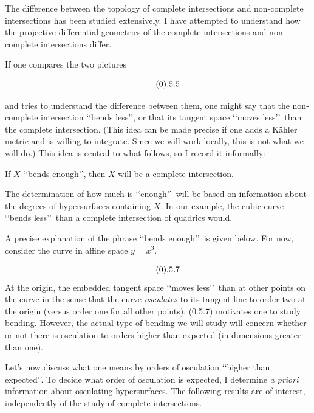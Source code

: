 \smallpagebreak

 
 The difference between the topology
  of complete intersections and non-complete intersections  
has been
studied extensively. I have attempted to understand how the projective
differential geometries of the complete intersections
and non-complete intersections differ.



If one compares the two pictures
$$
\ 
$$

\bigpagebreak

$$
\ \tag 0.5.5
$$

\noindent and tries to understand   the difference between
them, one might say that
the non-complete intersection \lq\lq bends less\rq\rq ,
or that its tangent space \lq\lq moves less\rq\rq\ 
than the complete intersection. (This idea can be made precise
 if one adds a K\"ahler metric and is willing to integrate.
Since we will work locally, this is not   what we will do.)
This idea  is central to what follows, so
I record it informally:

 If  
    $X$ \lq\lq bends
enough\rq\rq , then $X$ will be a complete intersection.
\endproclaim


 
The determination of how much is \lq\lq enough\rq\rq\
 will be based on
information about the degrees of hypersurfaces containing $X$. 
In our example, the cubic curve 
\lq\lq bends less\rq\rq\ than a complete intersection of quadrics
would.




A precise explanation of the phrase \lq\lq bends enough\rq\rq\
is given below.
For now, consider the curve in affine space $y= x^3$.
$$
\ 
$$

$$
\ \tag 0.5.7
$$
At the origin, the embedded tangent space \lq\lq moves less\rq\rq\
 than at
other points on the curve in the sense that the curve {\it osculates}
 to its tangent line
to order two at the origin (versus order one for all other points). 
  (0.5.7) motivates one to study bending.
However,  the actual
 type of bending we will  study  will 
concern whether or not  there is  osculation to orders 
higher than expected (in dimensions greater than one). 

  
 
 
\smallpagebreak

Let's now discuss
what one means by orders of osculation \lq\lq higher than
expected\rq\rq .
To decide what order of osculation is expected, 
 I determine 
  {\it a priori} information about osculating hypersurfaces.
The following results are of interest, independently of the study
of complete intersections.

